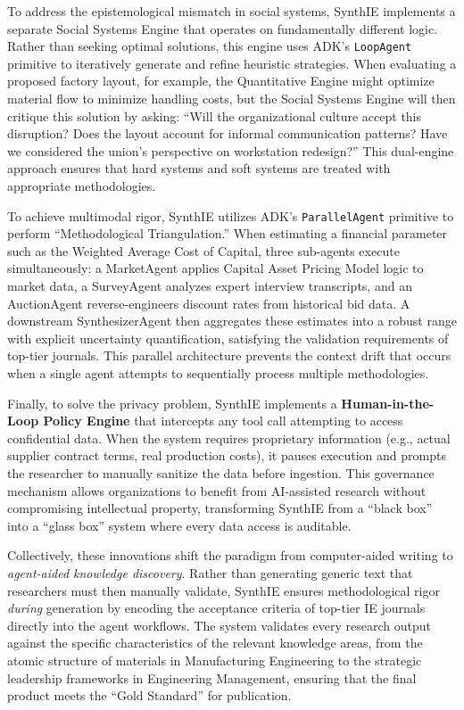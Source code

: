 \documentclass[12pt,a4paper]{article}
\begin{document}
To address the epistemological mismatch in social systems, SynthIE implements a separate Social Systems Engine that operates on fundamentally different logic. Rather than seeking optimal solutions, this engine uses ADK's \texttt{LoopAgent} primitive to iteratively generate and refine heuristic strategies. When evaluating a proposed factory layout, for example, the Quantitative Engine might optimize material flow to minimize handling costs, but the Social Systems Engine will then critique this solution by asking: ``Will the organizational culture accept this disruption? Does the layout account for informal communication patterns? Have we considered the union's perspective on workstation redesign?'' This dual-engine approach ensures that hard systems and soft systems are treated with appropriate methodologies.

To achieve multimodal rigor, SynthIE utilizes ADK's \texttt{ParallelAgent} primitive to perform ``Methodological Triangulation.'' When estimating a financial parameter such as the Weighted Average Cost of Capital, three sub-agents execute simultaneously: a MarketAgent applies Capital Asset Pricing Model logic to market data, a SurveyAgent analyzes expert interview transcripts, and an AuctionAgent reverse-engineers discount rates from historical bid data. A downstream SynthesizerAgent then aggregates these estimates into a robust range with explicit uncertainty quantification, satisfying the validation requirements of top-tier journals. This parallel architecture prevents the context drift that occurs when a single agent attempts to sequentially process multiple methodologies.

Finally, to solve the privacy problem, SynthIE implements a \textbf{Human-in-the-Loop Policy Engine} that intercepts any tool call attempting to access confidential data. When the system requires proprietary information (e.g., actual supplier contract terms, real production costs), it pauses execution and prompts the researcher to manually sanitize the data before ingestion. This governance mechanism allows organizations to benefit from AI-assisted research without compromising intellectual property, transforming SynthIE from a ``black box'' into a ``glass box'' system where every data access is auditable.

Collectively, these innovations shift the paradigm from computer-aided writing to \textit{agent-aided knowledge discovery}. Rather than generating generic text that researchers must then manually validate, SynthIE ensures methodological rigor \textit{during} generation by encoding the acceptance criteria of top-tier IE journals directly into the agent workflows. The system validates every research output against the specific characteristics of the relevant knowledge areas, from the atomic structure of materials in Manufacturing Engineering to the strategic leadership frameworks in Engineering Management, ensuring that the final product meets the ``Gold Standard'' for publication.
\end{document}
